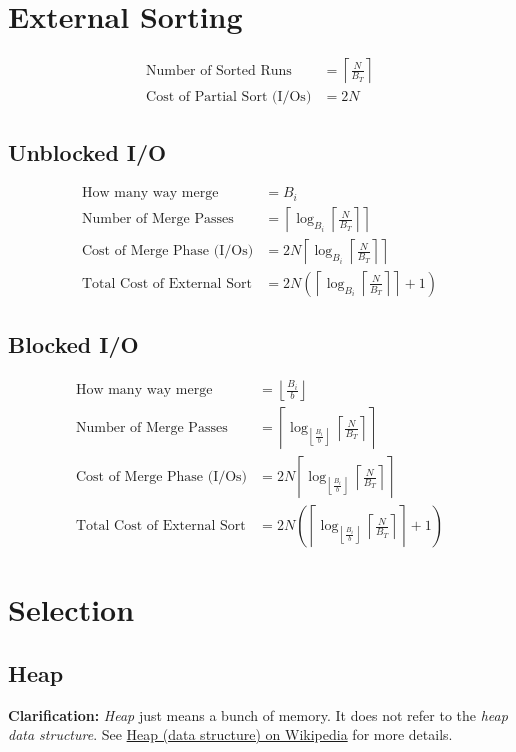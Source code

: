 \documentclass{article}
\newcommand{\floor}[1]{\left\lfloor#1\right\rfloor}
\newcommand{\ceil}[1]{\left\lceil#1\right\rceil}
\newcommand{\paren}[1]{\left(#1\right)}
\begin{document}
\section{External Sorting}
\label{sec:externalsorting}

\begin{align}
  \text{Number of Sorted Runs} &= \ceil{\frac{N}{B_T}}\\
  \text{Cost of Partial Sort (I/Os)} &= 2N
\end{align}

\subsection{Unblocked I/O}
\begin{align}
  \text{How many way merge} &= B_i \\
  \text{Number of Merge Passes} &= \ceil{\log_{B_i}\ceil{\frac{N}{B_T}}} \\
  \text{Cost of Merge Phase (I/Os)} &= 2N\ceil{\log_{B_i}\ceil{\frac{N}{B_T}}} \\
  \text{Total Cost of External Sort} &= 2N\paren{\ceil{\log_{B_i}\ceil{\frac{N}{B_T}}} + 1}
\end{align}

\subsection{Blocked I/O}
\begin{align}
  \text{How many way merge} &= \floor{\frac{B_i}{b}} \\
  \text{Number of Merge Passes} &= \ceil{\log_{\floor{\frac{B_i}{b}}}\ceil{\frac{N}{B_T}}} \\
  \text{Cost of Merge Phase (I/Os)} &= 2N\ceil{\log_{\floor{\frac{B_i}{b}}}\ceil{\frac{N}{B_T}}} \\
  \text{Total Cost of External Sort} &= 2N\paren{\ceil{\log_{\floor{\frac{B_i}{b}}}\ceil{\frac{N}{B_T}}} + 1}
\end{align}

\section{Selection}
\label{sec:selection}
\subsection{Heap}

\textbf{Clarification:} \textit{Heap} just means a bunch of memory. It
does not refer to the \textit{heap data structure}. See
\href{http://en.wikipedia.org/wiki/Heap\_(data\_structure)}{Heap (data
  structure) on Wikipedia} for more details.
\end{document}
